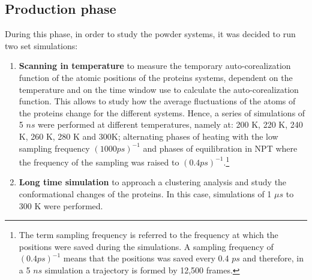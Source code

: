 \subsection{Production phase}
During this phase, in order to study the powder systems, it was decided to run two set simulations:
\begin{enumerate}
\item \textbf{Scanning in temperature} to measure the temporary auto-corealization function of the atomic positions of the proteins systems, dependent on the temperature and on the time window use to calculate the auto-corealization function. This allows to study how the average fluctuations of the atoms of the proteins change for the different systems. Hence, a series of simulations of 5 $ns$ were performed at different temperatures, namely at: 200 K, 220 K, 240 K, 260 K, 280 K and 300K; alternating phases of heating with the low sampling frequency $(1000 ps)^{-1}$ and phases of equilibration in NPT where the frequency of the sampling was raised to $(0.4 ps)^{-1}$.\footnote{The term sampling frequency is referred to the frequency at which the positions were saved during the simulations. A sampling frequency of $(0.4 ps)^{-1}$ means that the positions was saved every 0.4 $ps$ and therefore, in a 5 $ns$ simulation a trajectory is formed by 12,500 frames.}
\item \textbf{Long time simulation} to approach a clustering analysis and study the conformational changes of the proteins. In this case, simulations of 1 $\mu s$ to 300 K were performed.%
\end{enumerate}
